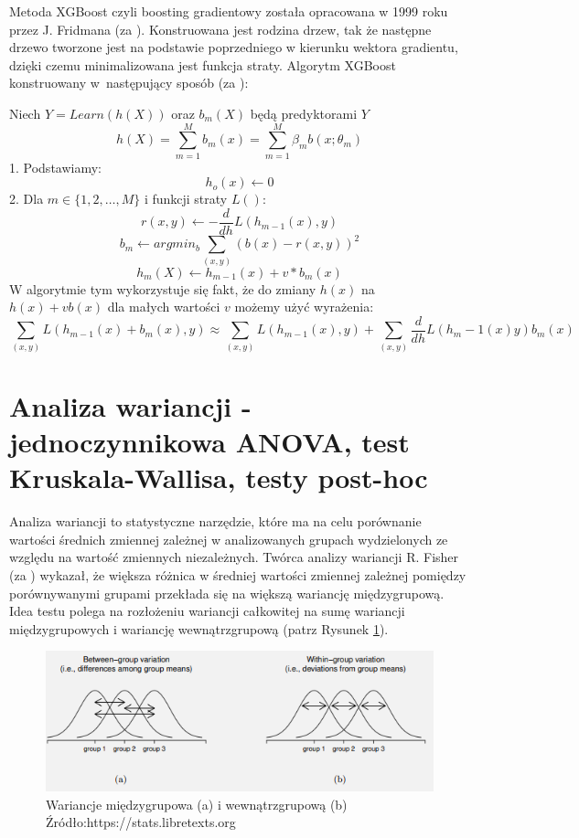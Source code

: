 \documentclass{amuthesis}
\begin{document}
Metoda XGBoost czyli boosting gradientowy została opracowana w 1999 roku przez J. Fridmana (za \textcite{grzybowska}).
Konstruowana jest rodzina drzew, tak że następne drzewo tworzone jest na podstawie poprzedniego w kierunku wektora gradientu, dzięki czemu minimalizowana jest funkcja straty.
Algorytm XGBoost konstruowany w~następujący sposób (za \textcite{grzybowska}):

Niech \(Y = Learn(h(X))\) oraz \(b_m(X)\) będą predyktorami \(Y\)
\[ h(X) = \sum_{m=1}^Mb_m(x) = \sum_{m=1}^M\beta_mb(x;\theta_m)
\]
1. Podstawiamy: \[h_o(x) \leftarrow 0 \]
2. Dla \(m \in \{1,2,\dots,M\}\) i funkcji straty \(L()\):
\[r(x,y) \leftarrow - \frac{d}{dh}L(h_{m-1}(x),y)\]
\[b_m \leftarrow argmin_b\sum_{(x,y)}(b(x)-r(x,y))^2\]
\[h_m(X) \leftarrow h_{m-1}(x)+v*b_m(x)\]
W algorytmie tym wykorzystuje się fakt, że do zmiany \(h(x)\) na \(h(x)+vb(x)\) dla małych wartości \(v\) możemy użyć wyrażenia:
\[\sum_{(x,y)}L(h_{m-1}(x)+b_m(x),y) \approx \sum_{(x,y)}L(h_{m-1}(x),y)+\sum_{(x,y)}\frac {d}{dh}L(h_m-1(x)y)b_m(x)
\]

\hypertarget{wariancja}{%
\section{Analiza wariancji - jednoczynnikowa ANOVA, test Kruskala-Wallisa, testy post-hoc}\label{wariancja}}

Analiza wariancji to statystyczne narzędzie, które ma na celu porównanie wartości średnich zmiennej zależnej w analizowanych grupach wydzielonych ze względu na wartość zmiennych niezależnych.
Twórca analizy wariancji R. Fisher (za \textcite{wariancja}) wykazał, że większa różnica w średniej wartości zmiennej zależnej pomiędzy porównywanymi grupami przekłada się na większą wariancję międzygrupową.
Idea testu polega na rozłożeniu wariancji całkowitej na sumę wariancji międzygrupowych i wariancję wewnątrzgrupową (patrz Rysunek \ref{fig:rycina4}).

\begin{figure}[t]

{\centering \includegraphics[width=1\linewidth]{figures/anova} 

}

\caption{Wariancje międzygrupowa (a) i wewnątrzgrupową (b)                              Źródło:https://stats.libretexts.org}\label{fig:rycina4}
\end{figure}
\end{document}
